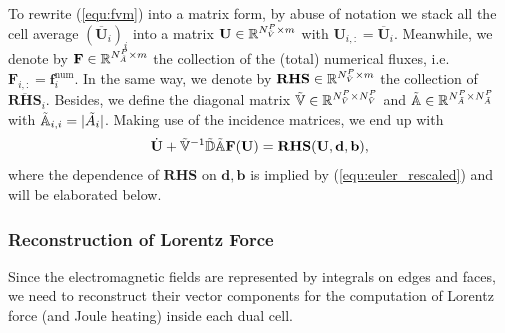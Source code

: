 \documentclass{article}
\begin{document}
To rewrite (\ref{equ:fvm}) into a matrix form, by abuse of notation we stack all the cell average $(\overline{\mathbf{U}}_i)_i$ into a matrix $\mathbf{U} \in \mathbb{R}^{N_{\Tilde{V}}^P \times m}$ with $\mathbf{U}_{i,:} = \overline{\mathbf{U}}_i$. Meanwhile, we denote by $\mathbf{F} \in \mathbb{R}^{N_{\Tilde{A}}^P \times m}$ the collection of the (total) numerical fluxes, i.e. $\mathbf{F}_{i,:} = \mathbf{f}^\text{num}_i$. In the same way, we denote by $\mathbf{RHS}\in \mathbb{R}^{N_{\Tilde{V}}^P \times m}$ the collection of $\overline{\mathbf{RHS}}_i$. Besides, we define the diagonal matrix $\mathbb{\Tilde{V}} \in \mathbb{R}^{N_{\Tilde{V}}^P \times N_{\Tilde{V}}^P}$ and $\mathbb{\Tilde{A}}\in \mathbb{R}^{N_{\Tilde{A}}^P \times N_{\Tilde{A}}^P}$ with $\mathbb{\Tilde{A}}_{i,i} = |\Tilde{A}_i|$. Making use of the incidence matrices, we end up with
\begin{equation*}
    \dot{\mathbf{U}} + \mathbb{\Tilde{V}}^{-1}\mathbb{\Tilde{D}}\mathbb{\Tilde{A}}\mathbf{F}(\mathbf{U})  = \mathbf{RHS}(\mathbf{U},\mathbf{d},\mathbf{b}),
\end{equation*}
where the dependence of $\mathbf{RHS}$ on $\mathbf{d}, \mathbf{b}$ is implied by (\ref{equ:euler_rescaled}) and will be elaborated below.

\subsubsection{Reconstruction of Lorentz Force}
Since the electromagnetic fields are represented by integrals on edges and faces, we need to reconstruct their vector components for the computation of Lorentz force (and Joule heating) inside each dual cell.    
\end{document}

